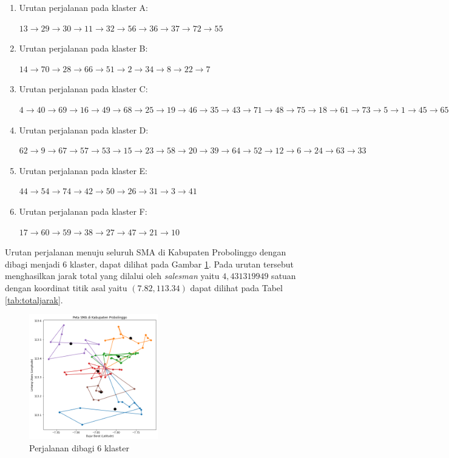 \begin{enumerate}

\item Urutan perjalanan pada klaster A:

$13\rightarrow29\rightarrow30\rightarrow11\rightarrow32\rightarrow56\rightarrow36\rightarrow37\rightarrow72\rightarrow55$

\item Urutan perjalanan pada klaster B:

$14\rightarrow70\rightarrow28\rightarrow66\rightarrow51\rightarrow2\rightarrow34\rightarrow8\rightarrow22\rightarrow7$

\item Urutan perjalanan pada klaster C:

$4\rightarrow40\rightarrow69\rightarrow16\rightarrow49\rightarrow68\rightarrow25\rightarrow19\rightarrow46\rightarrow35\rightarrow43\rightarrow71\rightarrow48\rightarrow75\rightarrow18\rightarrow61\rightarrow73\rightarrow5\rightarrow1\rightarrow45\rightarrow65$

\item Urutan perjalanan pada klaster D:

$62\rightarrow9\rightarrow67\rightarrow57\rightarrow53\rightarrow15\rightarrow23\rightarrow58\rightarrow20\rightarrow39\rightarrow64\rightarrow52\rightarrow12\rightarrow6\rightarrow24\rightarrow63\rightarrow33$

\item Urutan perjalanan pada klaster E:

$44\rightarrow54\rightarrow74\rightarrow42\rightarrow50\rightarrow26\rightarrow31\rightarrow3\rightarrow41$

\item Urutan perjalanan pada klaster F:

$17\rightarrow60\rightarrow59\rightarrow38\rightarrow27\rightarrow47\rightarrow21\rightarrow10$

\end{enumerate}

Urutan perjalanan menuju seluruh SMA di Kabupaten Probolinggo dengan dibagi menjadi 6 klaster, dapat dilihat pada Gambar \ref{fig:hasil_mtsp6}. Pada urutan tersebut menghasilkan jarak total yang dilalui oleh \textit{salesman} yaitu $4,431319949$ satuan dengan koordinat titik asal yaitu $(7.82, 113.34)$ dapat dilihat pada Tabel \ref{tab:totaljarak}.

\begin{figure}[H]
\centering
\includegraphics[width=0.5\textwidth]{Gambar/hasil_mtsp/6}
\caption{Perjalanan dibagi 6 klaster}
\label{fig:hasil_mtsp6}
\end{figure}

